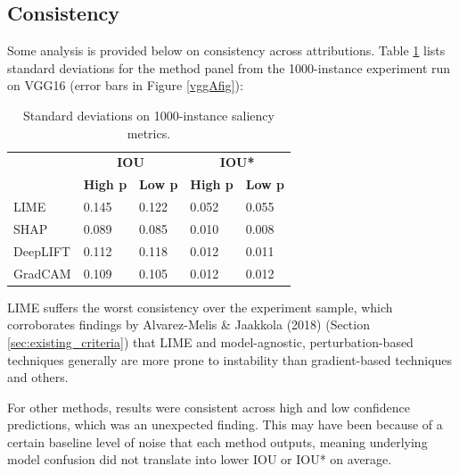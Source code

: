 \documentclass[main]{subfiles}
\begin{document}
\newpage
\subsection{Consistency}\label{sec:consistency}
Some analysis is provided below on consistency across attributions. Table \ref{consistencytable} lists standard deviations for the method panel from the 1000-instance experiment run on VGG16 (error bars in Figure \ref{vggAfig}):

\begin{table}[htbp]
\centering
\begin{tabular}{l|l|l|l|l|}
\cline{2-5}
                  & \multicolumn{2}{c|}{\textbf{IOU}} & \multicolumn{2}{c|}{\textbf{IOU*}} \\ \cline{2-5} 
                  & \textbf{High p}           & \textbf{Low p}          & \textbf{High p}           & \textbf{Low p}           \\ \hline
\multicolumn{1}{|l|}{LIME}     & 0.145            & 0.122          & 0.052            & 0.055           \\ \hline
\multicolumn{1}{|l|}{SHAP}      & 0.089            & 0.085          & 0.010            & 0.008           \\ \hline
\multicolumn{1}{|l|}{DeepLIFT}  & 0.112            & 0.118          & 0.012            & 0.011           \\ \hline
\multicolumn{1}{|l|}{GradCAM}   & 0.109            & 0.105          & 0.012            & 0.012           \\ \hline
\end{tabular}

\caption{Standard deviations on 1000-instance saliency metrics.}
\label{consistencytable}

\end{table}

\noindent LIME suffers the worst consistency over the experiment sample, which corroborates findings by Alvarez-Melis \& Jaakkola (2018) (Section \ref{sec:existing_criteria}) that LIME and model-agnostic, perturbation-based techniques generally are more prone to instability than gradient-based techniques and others. 

For other methods, results were consistent across high and low confidence predictions, which was an unexpected finding. This may have been because of a certain baseline level of  noise that each method outputs, meaning underlying model confusion did not translate into lower IOU or IOU* on average.
\end{document}
